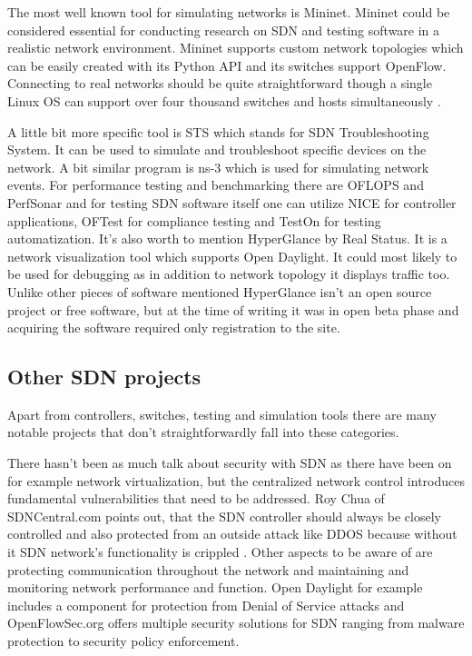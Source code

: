\documentclass[english]{tktltiki2}
\theoremstyle{definition}
\theoremstyle{remark}
\begin{document}
The most well known tool for simulating networks is Mininet. Mininet could be considered essential for conducting research on SDN and testing software in a realistic network environment. Mininet supports custom network topologies which can be easily created with its Python API and its switches support OpenFlow. Connecting to real networks should be quite straightforward though a single Linux OS can support  over four thousand switches and hosts simultaneously \cite{MN14}. 

A little bit more specific tool is STS which stands for SDN Troubleshooting System. It can be used to simulate and troubleshoot specific devices on the network. A bit similar program is ns-3 which is used for simulating network events. For performance testing and benchmarking there are OFLOPS and PerfSonar and for testing SDN software itself one can utilize NICE for controller applications, OFTest for compliance testing and TestOn for testing automatization. It’s also worth to mention HyperGlance by Real Status. It is a network visualization tool which supports Open Daylight. It could most likely to be used for debugging as in addition to network topology it displays traffic too. Unlike other pieces of software mentioned HyperGlance isn’t an open source project or free software, but at the time of writing it was in open beta phase and acquiring the software required only registration to the site.

\subsection{Other SDN projects}

Apart from controllers, switches, testing and simulation tools there are many notable projects that don’t straightforwardly fall into these categories.

There hasn’t been as much talk about security with SDN as there have been on for example network virtualization, but the centralized network control introduces fundamental vulnerabilities that need to be addressed. Roy Chua of SDNCentral.com points out, that the SDN controller should always be closely controlled and also protected from an outside attack like DDOS because without it SDN network's functionality is crippled \cite{CHU2} . Other aspects to be aware of are protecting communication throughout the network and maintaining and monitoring network performance and function. Open Daylight for example includes a component for protection from Denial of Service attacks and OpenFlowSec.org offers multiple security solutions for SDN ranging from malware protection to security policy enforcement.
\end{document}
